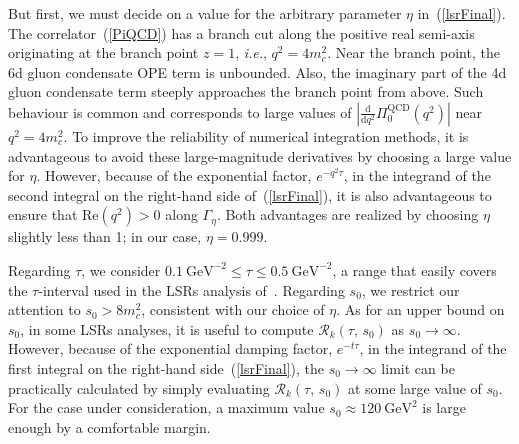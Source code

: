 \documentclass[12pt, letterpaper]{article}
\renewcommand{\Re}{\mathrm{Re}}
\newcommand{\lsr}{\mathcal{R}}
\newcommand{\gev}{\ensuremath{\text{GeV}}}
\newcommand{\ie}{\textit{i.e.}}
\begin{document}
But first, we must decide on a value for the arbitrary parameter $\eta$ in~(\ref{lsrFinal}). 
The correlator~(\ref{PiQCD}) has a branch cut along the positive real semi-axis
originating at the branch point $z=1$, \ie, $q^2=4m_c^2$.  
Near the branch point, the 6d gluon condensate OPE term is unbounded.
Also, the imaginary part of the 4d gluon condensate term
steeply approaches the branch point from above.
Such behaviour is common and corresponds to large values of
$|\frac{\mathrm{d}}{\mathrm{d}q^2}\Pi_0^{\text{QCD}}(q^2)|$ near $q^2=4m_c^2$.
To improve the reliability of numerical integration methods,
it is advantageous to avoid these large-magnitude derivatives by
choosing a large value for $\eta$.
However, because of the exponential factor, $e^{-q^2\tau}$, in the integrand 
of the second integral on the right-hand side of~(\ref{lsrFinal}), it is also advantageous
to ensure that $\Re(q^2)> 0$ along $\Gamma_{\eta}$.
Both advantages are realized by choosing $\eta$ slightly less than 1; 
in our case, $\eta=0.999$.

Regarding $\tau$, we consider $0.1\ \gev^{-2}\leq\tau\leq 0.5\ \gev^{-2}$, a range that 
easily covers the $\tau$-interval used in the LSRs analysis of~\cite{Berg:2012gd}.
Regarding $s_0$, we restrict our attention to $s_0>8m_c^2$, consistent with our choice of $\eta$.
As for an upper bound on $s_0$, in some LSRs analyses, 
it is useful to compute $\lsr_k(\tau,\,s_0)$ as $s_0\rightarrow\infty$.  
However, because of the exponential damping factor, $e^{-t\tau}$, in the integrand of the 
first integral on the right-hand side~(\ref{lsrFinal}), 
the $s_0\rightarrow\infty$ limit can be practically calculated by simply 
evaluating $\lsr_k(\tau,\,s_0)$ at some large value of $s_0$.  
For the case under consideration, a maximum value $s_0\approx 120\ \gev^2$ 
is large enough by a comfortable margin.
\end{document}
